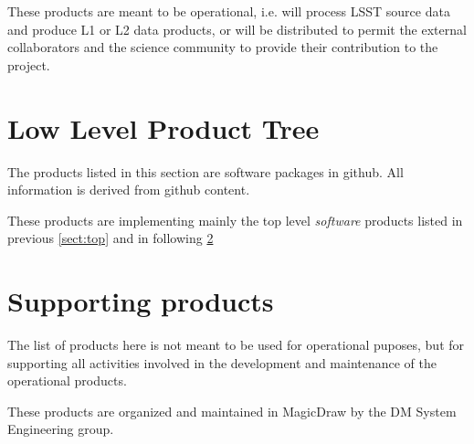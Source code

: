 These products are meant to be operational, i.e. will process LSST source data and produce L1 or L2 data products, or will be distributed to permit the external collaborators and the science community to provide their contribution to the project.



\section{Low Level Product Tree}\label{sect:low}

The products listed in this section are software packages in github.
All information is derived from github content.

These products are implementing mainly the top level \textit{software} products listed in previous \ref{sect:top} and in following \ref{sect:sups}



\section{Supporting products}\label{sect:sups}

The list of products here is not meant to be used for operational puposes, but for supporting all activities involved in the development and maintenance of the operational products. 

These products are organized and maintained in MagicDraw by the DM System Engineering group.


